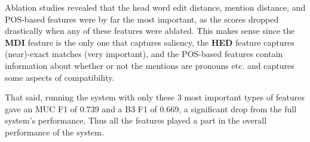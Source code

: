 \documentclass[12pt,a4paper]{article}
\begin{document}
Ablation studies revealed that the head word edit distance, mention distance, and POS-based features were by far the most important, as the scores dropped drastically when any of these features were ablated.
This makes sense since the \textbf{MDI} feature is the only one that captures saliency, the \textbf{HED} feature captures (near)-exact matches (very important), and the POS-based features contain information about whether or not the mentions are pronouns etc. and captures some aspects of compatibility. 

That said, running the system with only these 3 most important types of features gave an MUC F1 of 0.739 and a B3 F1 of 0.669, a significant drop from the full system's performance.  Thus all the features played a part in the overall performance of the system. 
\end{document}
